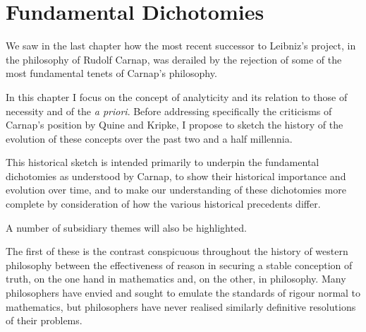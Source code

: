 
\chapter{Fundamental Dichotomies}\label{FundamentalDichotomies}


We saw in the last chapter how the most recent successor to
Leibniz's project, in the philosophy of Rudolf
Carnap, was derailed by the rejection of some of
the most fundamental tenets of Carnap's philosophy. 

In this chapter I focus on the concept of analyticity and
its relation to those of necessity and of the {\it a priori}.
Before addressing specifically the criticisms of Carnap's position by
Quine and Kripke, I propose to sketch the history of the evolution of
these concepts over the past two and a half millennia.

This historical sketch is intended primarily to underpin the
fundamental dichotomies as understood by Carnap, to show their
historical importance and evolution over time, and to make our
understanding of these dichotomies more complete by consideration of
how the various historical precedents differ.

A number of subsidiary themes will also be highlighted.

The first of these is the contrast conspicuous throughout the history of
western philosophy between the effectiveness of reason in securing a
stable conception of truth, on the one hand in mathematics and, on the
other, in philosophy.
Many philosophers have envied and sought to emulate the standards of
rigour normal to mathematics, but philosophers have never realised
similarly definitive resolutions of their problems.

